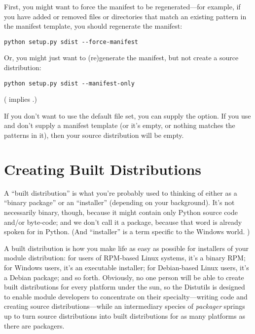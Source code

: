 \documentclass{howto}
\begin{document}
First, you might want to force the manifest to be regenerated---for
example, if you have added or removed files or directories that match an
existing pattern in the manifest template, you should regenerate the
manifest:
\begin{verbatim}
python setup.py sdist --force-manifest
\end{verbatim}

Or, you might just want to (re)generate the manifest, but not create a
source distribution:
\begin{verbatim}
python setup.py sdist --manifest-only
\end{verbatim}
( implies .)

If you don't want to use the default file set, you can supply the
 option.  If you use
 and don't supply a manifest template (or
it's empty, or nothing matches the patterns in it), then your source
distribution will be empty.


\section{Creating Built Distributions}
\label{built-dist}

A ``built distribution'' is what you're probably used to thinking of
either as a ``binary package'' or an ``installer'' (depending on your
background).  It's not necessarily binary, though, because it might
contain only Python source code and/or byte-code; and we don't call it a
package, because that word is already spoken for in Python.  (And
``installer'' is a term specific to the Windows world.  )

A built distribution is how you make life as easy as possible for
installers of your module distribution: for users of RPM-based Linux
systems, it's a binary RPM; for Windows users, it's an executable
installer; for Debian-based Linux users, it's a Debian package; and so
forth.  Obviously, no one person will be able to create built
distributions for every platform under the sun, so the Distutils is
designed to enable module developers to concentrate on their
specialty---writing code and creating source distributions---while an
intermediary species of \emph{packager} springs up to turn source
distributions into built distributions for as many platforms as there
are packagers.
\end{document}
